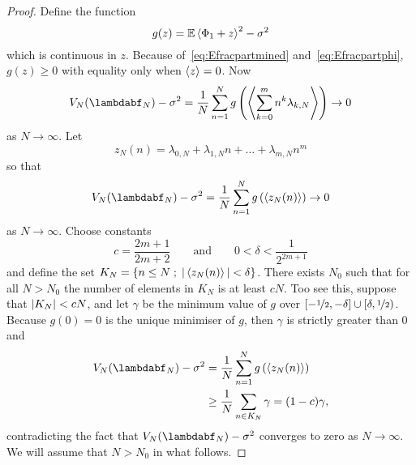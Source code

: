 \documentclass[journal]{IEEEtran}
\begin{document}
\begin{proof}
Define the function
\begin{equation}\label{eq:gz}
g(z) = {\mathbb E}\left\langle \Phi_1 + z \right\rangle^2 - \sigma^2
\end{equation}
which is continuous in $z$. Because of~\eqref{eq:Efracpartmined} and~\eqref{eq:Efracpartphi}, $g(z) \geq 0$ with equality only when $\left\langle z \right\rangle = 0$.  Now
\[
V_N(\lambdabf_N) - \sigma^2 = \frac{1}{N}\sum_{n=1}^{N} g\left( \fracpart{ \sum_{k=0}^{m}{n^k \lambda_{k,N}} } \right) \rightarrow 0
\]
as $N \rightarrow \infty$. Let
\[
z_N(n) = \lambda_{0,N} + \lambda_{1,N} n + \dots + \lambda_{m,N} n^m
\]
so that 
\[
V_N(\lambdabf_N) - \sigma^2 = \frac{1}{N}\sum_{n=1}^{N} g\left( \fracpart{z_N(n)} \right) \rightarrow 0
\] 
as $N \rightarrow \infty$.
Choose constants 
\[
c = \frac{2m+1}{2m+2} \qquad \text{and} \qquad 0 < \delta < \frac{1}{2^{2m+1}}
\]
and define the set $K_{N}=\left\{  n\leq N \; ; \; \vert \left\langle z_N(n) \right\rangle \vert < \delta \right\}$.  There exists $N_0$ such that for all $N > N_0$ the number of elements in $K_N$ is at least $cN$.  Too see this, suppose that $\vert K_N \vert < cN$, and let $\gamma$ be the minimum value of $g$ over $[-\nicefrac{1}{2},-\delta] \cup [\delta, \nicefrac{1}{2})$. Because $g(0) = 0$ is the unique minimiser of $g$, then $\gamma$ is strictly greater than $0$ and
\begin{align*}
V_N(\lambdabf_N) - \sigma^2 &= \frac{1}{N}\sum_{n=1}^{N} g\left( \fracpart{z_N(n)} \right) \\
&\geq \frac{1}{N}\sum_{n\in K_N} \gamma = (1-c)\gamma,
\end{align*}
contradicting the fact that $V_N(\lambdabf_N) - \sigma^2$ converges to zero as $N \rightarrow \infty$.  We will assume that $N > N_0$ in what follows.


\end{proof}
\end{document}
